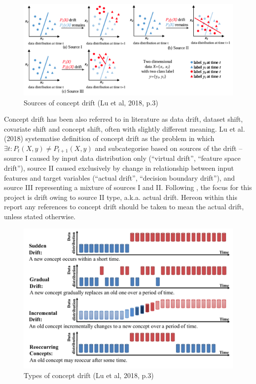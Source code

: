 \documentclass{svproc}
\begin{document}
\begin{figure}
	\centering
	\includegraphics[scale=.6]{figures/Fig2_drift_sources.png}
	\caption{Sources of concept drift (Lu et al, 2018, p.3)}
	\label{fig:fig2}
\end{figure}

Concept drift has been also referred to in literature as data drift, dataset shift, covariate shift and concept shift, often with slightly different meaning. Lu et al. (2018) systematise definition of concept drift as the problem in which $\exists{t}: P_t(X,y) \neq P_{t+1}(X,y)$ and subcategorise based on sources of the drift – source I caused by input data distribution only (“virtual drift”, “feature space drift”), source II caused exclusively by change in relationship between input features and target variables (“actual drift”, “decision boundary drift”), and source III representing a mixture of sources I and II. Following \cite{pham2025}, the focus for this project is drift owing to source II type, a.k.a. actual drift. Hereon within this report any references to concept drift should be taken to mean the actual drift, unless stated otherwise.

\begin{figure}
	\centering
	\includegraphics[scale=.5]{figures/Fig3_drift_types}
	\caption{Types of concept drift (Lu et al, 2018, p.3)}
	\label{fig:fig3}
\end{figure}
\end{document}
